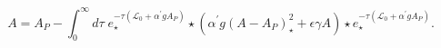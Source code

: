 \begin{equation}
A=A_{P}-\int_{0}^{\infty }d\tau \;e_{\star }^{-\tau \left( \mathcal{L}%
_{0}+\alpha ^{\prime }gA_{P}\right) }\star \left( \alpha ^{\prime }g\left(
A-A_{P}\right) _{\star }^{2}+\epsilon \gamma A\right) \star e_{\star
}^{-\tau \left( \mathcal{L}_{0}+\alpha ^{\prime }gA_{P}\right) }.
\label{int}
\end{equation}%
